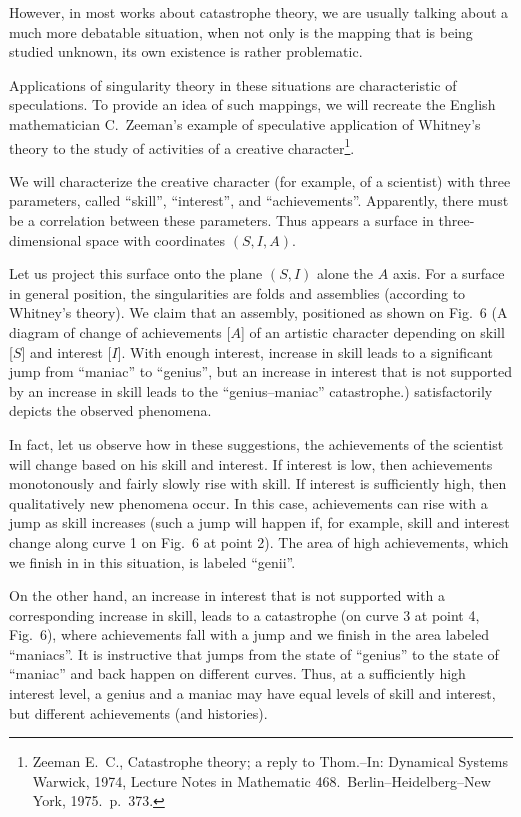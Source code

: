 \documentclass[12pt]{amsart}
\begin{document}
However, in most works about catastrophe theory, we are usually talking about a
much more debatable situation, when not only is the mapping that is being
studied unknown, its own existence is rather problematic.

Applications of singularity theory in these situations are characteristic of
speculations.
To provide an idea of such mappings, we will recreate the English mathematician
C.\ Zeeman's example of speculative application of Whitney's theory to the study
of activities of a creative character\footnote{Zeeman E.\ C., Catastrophe
theory; a reply to Thom.--In: Dynamical Systems Warwick, 1974, Lecture Notes in
Mathematic 468.\ Berlin--Heidelberg--New York, 1975.\ p.\ 373.}.

We will characterize the creative character (for example, of a scientist) with
three parameters, called ``skill'', ``interest'', and ``achievements''.
Apparently, there must be a correlation between these parameters.
Thus appears a surface in three-dimensional space with coordinates $(S,I,A)$.

Let us project this surface onto the plane $(S,I)$ alone the $A$ axis.
For a surface in general position, the singularities are folds and assemblies
(according to Whitney's theory).
We claim that an assembly, positioned as shown on Fig.\ 6 (A diagram of change of
achievements [$A$] of an artistic character depending on skill [$S$] and
interest [$I$].
With enough interest, increase in skill leads to a significant jump from
``maniac'' to ``genius'', but an increase in interest that is not supported by
an increase in skill leads to the ``genius--maniac'' catastrophe.) satisfactorily
depicts the observed phenomena.

In fact, let us observe how in these suggestions, the achievements of the
scientist will change based on his skill and interest.
If interest is low, then achievements monotonously and fairly slowly rise with
skill.
If interest is sufficiently high, then qualitatively new phenomena occur.
In this case, achievements can rise with a jump as skill increases (such a jump
will happen if, for example, skill and interest change along curve 1 on Fig.\ 6
at point 2).
The area of high achievements, which we finish in in this situation, is labeled
``genii''.

On the other hand, an increase in interest that is not supported with a
corresponding increase in skill, leads to a catastrophe (on curve 3 at point 4,
Fig.\ 6), where achievements fall with a jump and we finish in the area labeled
``maniacs''.
It is instructive that jumps from the state of ``genius'' to the state of
``maniac'' and back happen on different curves.
Thus, at a sufficiently high interest level, a genius and a maniac may have
equal levels of skill and interest, but different achievements (and histories).
\end{document}
